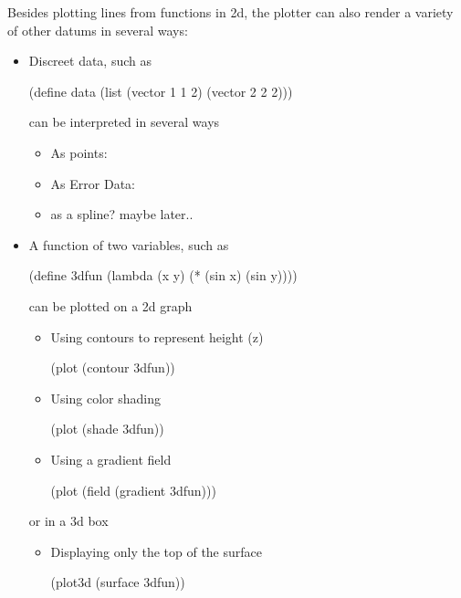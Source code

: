 \documentclass{article}
\begin{document}
{Besides plotting lines from functions in 2d, the plotter
      can also render a variety of other datums
      in several ways:
\begin{itemize}
\item 
  Discreet data, such as
  \begin{schemedisplay}
    
(define data 
 (list 
  (vector 1 1 2) 
  (vector 2 2 2)))
\end{schemedisplay}
can be interpreted in several ways\begin{itemize}
\item As points: 
\end{itemize}
\begin{itemize}
\item As Error Data: 
\end{itemize}
\begin{itemize}
\item as a spline? maybe later..
\end{itemize}



\item 
A function of two variables, such as
\begin{schemedisplay}
(define 3dfun (lambda (x y) (* (sin x) (sin y))))
\end{schemedisplay}
can be plotted on a 2d graph\begin{itemize}
\item Using contours to represent height (z)
\begin{schemedisplay}
(plot (contour 3dfun))
\end{schemedisplay}

\item Using color shading
\begin{schemedisplay}
(plot (shade 3dfun))
\end{schemedisplay}

\item Using a gradient field
\begin{schemedisplay}
(plot (field (gradient 3dfun)))
\end{schemedisplay}

\end{itemize}
or in a 3d box\begin{itemize}
\item Displaying only the top of the surface
\begin{schemedisplay}
(plot3d (surface 3dfun))
\end{schemedisplay}


\end{itemize}
\end{itemize}}
\end{document}
